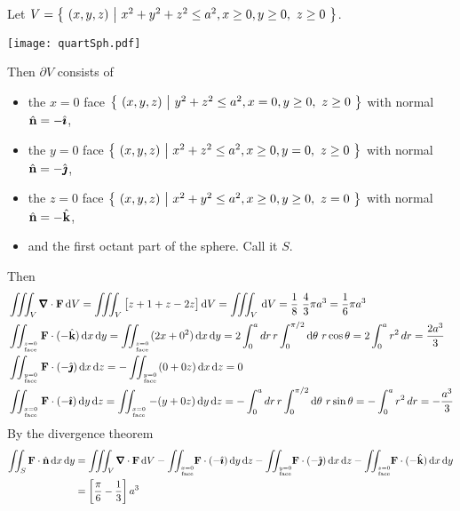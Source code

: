 \begin{solution} 
Let $V=\big\{ \ (x,y,z)\ \big|\ x^2+y^2+z^2\le a^2, x\ge 0, y\ge 0,\ z\ge 0\ \big\}$. 
\begin{center}
       \texttt{[image: quartSph.pdf]}
\end{center}
Then $\partial V$ consists of
\begin{itemize}\itemsep1pt \parskip0pt  %
\item
   the $x=0$ face $\big\{ \ (x,y,z)\ \big|\ y^2+z^2\le a^2, x=0, y\ge 0,\ z\ge 0\ \big\}$
   with normal $\hat{\mathbf{n}}=-\hat{\pmb{\imath}}$, 
\item
   the $y=0$ face $\big\{ \ (x,y,z)\ \big|\ x^2+z^2\le a^2, x\ge 0, y= 0,\ z\ge 0\ \big\}$
   with normal $\hat{\mathbf{n}}=-\hat{\pmb{\jmath}}$, 
\item
   the $z=0$ face $\big\{ \ (x,y,z)\ \big|\ x^2+y^2\le a^2, x\ge 0, y\ge 0,\ z= 0\ \big\}$
   with normal $\hat{\mathbf{n}}=-\hat{\mathbf{k}}$, 
\item
   and the first octant part of the sphere. Call it $S$. 
\end{itemize}
Then
\begin{align*}
&\tripInt_V \vnabla\cdot\vF\,\dee{V}=\tripInt_V\big[z+1+z-2z\big]\,\dee{V}
=\tripInt_V \,\dee{V}=\frac{1}{8}\ \frac{4}{3}\pi a^3=\frac{1}{6}\pi a^3\\
%
&\dblInt_{\Atop{z=0}{\rm face}}\vF\cdot(-\hk)\,\dee{x}\,\dee{y}
=\dblInt_{\Atop{z=0}{\rm face}}(2x+0^2)\,\dee{x}\,\dee{y}
=2\int_0^a dr\,r\int_0^{\pi/2}\dee{\theta}\ r\cos\theta
=2\int _0^a r^2\,dr
=\frac{2a^3}{3}\\
%
&\dblInt_{\Atop{y=0}{\rm face}}\vF\cdot(-\hj)\,\dee{x}\,\dee{z}
=-\dblInt_{\Atop{y=0}{\rm face}}(0+0z)\,\dee{x}\,\dee{z}
=0\\
%
&\dblInt_{\Atop{x=0}{\rm face}}\vF\cdot(-\hi)\,\dee{y}\,\dee{z}
=\dblInt_{\Atop{x=0}{\rm face}}-(y+0z)\,\dee{y}\,\dee{z}
=-\int_0^a dr\,r\int_0^{\pi/2}\dee{\theta}\ r\sin\theta
=-\int _0^a r^2\,dr=-\frac{a^3}{3}
\end{align*}
By the divergence theorem
\begin{align*}
\dblInt_{S}\vF\cdot\hn\,\dee{x}\,\dee{y}
&=\tripInt_V \vnabla\cdot\vF\,\dee{V}
-\dblInt_{\Atop{x=0}{\rm face}}\hskip-3pt\vF\cdot(-\hi)\,\dee{y}\,\dee{z}
-\dblInt_{\Atop{y=0}{\rm face}}\hskip-3pt\vF\cdot(-\hj)\,\dee{x}\,\dee{z}
-\dblInt_{\Atop{z=0}{\rm face}}\hskip-3pt\vF\cdot(-\hk)\,\dee{x}\,\dee{y}
\\
&=\left[\frac{\pi}{6}-\frac{1}{3}\right]a^3
\end{align*}
\end{solution}

